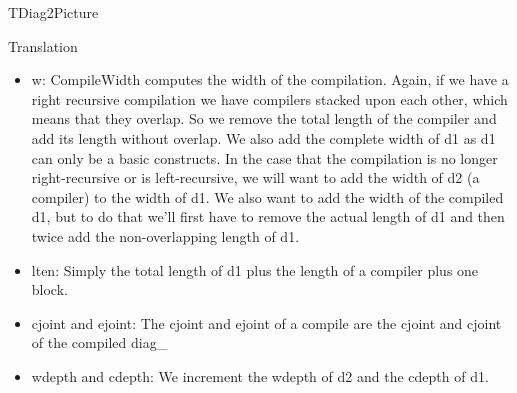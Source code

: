 \documentclass{article}
\begin{document}
\begin{subsection}{TDiag2Picture}
\begin{subsubsection}{Translation}
\begin{itemize}
	\item w: CompileWidth computes the width of the compilation. Again, if we have a right recursive compilation we have compilers stacked upon each other, which means that they overlap. So we remove the total length of the compiler and add its length without overlap. We also add the complete width of d1 as d1 can only be a basic constructs. In the case that the compilation is no longer right-recursive or is left-recursive, we will want to add the width of d2 (a compiler) to the width of d1. We also want to add the width of the compiled d1, but to do that we'll first have to remove the actual length of d1 and then twice add the non-overlapping length of d1.
	\item lten: Simply the total length of d1 plus the length of a compiler plus one block.
	\item cjoint and ejoint: The cjoint and ejoint of a compile are the cjoint and cjoint of the compiled diag\_
	\item wdepth and cdepth: We increment the wdepth of d2 and the cdepth of d1.
	\end{itemize}

\end{subsubsection}
\end{subsection}
\end{document}
